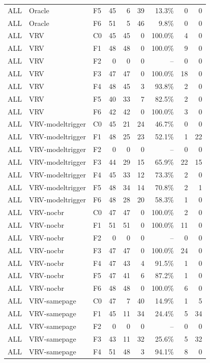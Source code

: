 \begin{tabular}{lllrrrrrr}
ALL & Oracle & F5 & 45 & 6 & 39 & 13.3\% & 0 & 0 \\
ALL & Oracle & F6 & 51 & 5 & 46 & 9.8\% & 0 & 0 \\
ALL & VRV & C0 & 45 & 45 & 0 & 100.0\% & 4 & 0 \\
ALL & VRV & F1 & 48 & 48 & 0 & 100.0\% & 9 & 0 \\
ALL & VRV & F2 & 0 & 0 & 0 & -- & 0 & 0 \\
ALL & VRV & F3 & 47 & 47 & 0 & 100.0\% & 18 & 0 \\
ALL & VRV & F4 & 48 & 45 & 3 & 93.8\% & 2 & 0 \\
ALL & VRV & F5 & 40 & 33 & 7 & 82.5\% & 2 & 0 \\
ALL & VRV & F6 & 42 & 42 & 0 & 100.0\% & 3 & 0 \\
ALL & VRV-modeltrigger & C0 & 45 & 21 & 24 & 46.7\% & 0 & 0 \\
ALL & VRV-modeltrigger & F1 & 48 & 25 & 23 & 52.1\% & 1 & 22 \\
ALL & VRV-modeltrigger & F2 & 0 & 0 & 0 & -- & 0 & 0 \\
ALL & VRV-modeltrigger & F3 & 44 & 29 & 15 & 65.9\% & 22 & 15 \\
ALL & VRV-modeltrigger & F4 & 45 & 33 & 12 & 73.3\% & 2 & 0 \\
ALL & VRV-modeltrigger & F5 & 48 & 34 & 14 & 70.8\% & 2 & 1 \\
ALL & VRV-modeltrigger & F6 & 48 & 28 & 20 & 58.3\% & 1 & 0 \\
ALL & VRV-nocbr & C0 & 47 & 47 & 0 & 100.0\% & 2 & 0 \\
ALL & VRV-nocbr & F1 & 51 & 51 & 0 & 100.0\% & 11 & 0 \\
ALL & VRV-nocbr & F2 & 0 & 0 & 0 & -- & 0 & 0 \\
ALL & VRV-nocbr & F3 & 47 & 47 & 0 & 100.0\% & 24 & 0 \\
ALL & VRV-nocbr & F4 & 47 & 43 & 4 & 91.5\% & 1 & 0 \\
ALL & VRV-nocbr & F5 & 47 & 41 & 6 & 87.2\% & 1 & 0 \\
ALL & VRV-nocbr & F6 & 48 & 48 & 0 & 100.0\% & 6 & 0 \\
ALL & VRV-samepage & C0 & 47 & 7 & 40 & 14.9\% & 1 & 5 \\
ALL & VRV-samepage & F1 & 45 & 11 & 34 & 24.4\% & 5 & 34 \\
ALL & VRV-samepage & F2 & 0 & 0 & 0 & -- & 0 & 0 \\
ALL & VRV-samepage & F3 & 43 & 11 & 32 & 25.6\% & 5 & 32 \\
ALL & VRV-samepage & F4 & 51 & 48 & 3 & 94.1\% & 8 & 0 \\

\end{tabular}
